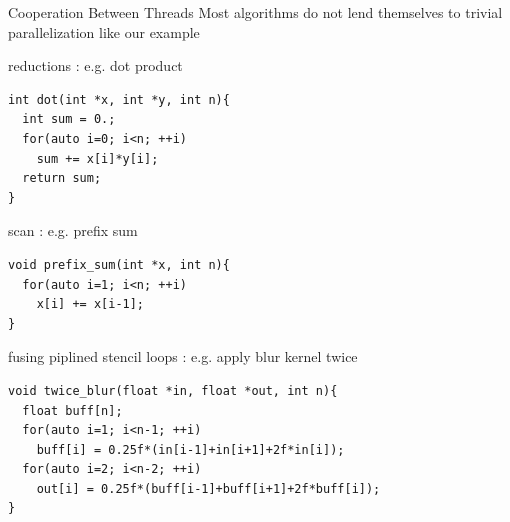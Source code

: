 \begin{frame}[fragile]{Cooperation Between Threads}
    \centering
    Most algorithms do not lend themselves to trivial parallelization like our \axpy example

    \begin{code}{reductions : e.g. dot product}
        \begin{lstlisting}[style=boxcudatiny]
int dot(int *x, int *y, int n){
  int sum = 0.;
  for(auto i=0; i<n; ++i)
    sum += x[i]*y[i];
  return sum;
}
        \end{lstlisting}
    \end{code}
\vspace{-7pt}
        \begin{code}{scan : e.g. prefix sum}
            \begin{lstlisting}[style=boxcudatiny]
void prefix_sum(int *x, int n){
  for(auto i=1; i<n; ++i)
    x[i] += x[i-1];
}
        \end{lstlisting}
    \end{code}
\vspace{-7pt}
    \begin{code}{fusing piplined stencil loops : e.g. apply blur kernel twice}
        \begin{lstlisting}[style=boxcudatiny]
void twice_blur(float *in, float *out, int n){
  float buff[n];
  for(auto i=1; i<n-1; ++i)
    buff[i] = 0.25f*(in[i-1]+in[i+1]+2f*in[i]);
  for(auto i=2; i<n-2; ++i)
    out[i] = 0.25f*(buff[i-1]+buff[i+1]+2f*buff[i]);
}
        \end{lstlisting}
    \end{code}

\end{frame}

